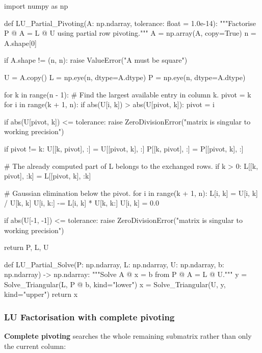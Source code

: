 \begin{python}
import numpy as np


def LU_Partial_Pivoting(A: np.ndarray,
                        tolerance: float = 1.0e-14):
    """Factorise P @ A = L @ U using partial row pivoting."""
    A = np.array(A, copy=True)
    n = A.shape[0]

    if A.shape != (n, n):
        raise ValueError("A must be square")

    U = A.copy()
    L = np.eye(n, dtype=A.dtype)
    P = np.eye(n, dtype=A.dtype)

    for k in range(n - 1):
        # Find the largest available entry in column k.
        pivot = k
        for i in range(k + 1, n):
            if abs(U[i, k]) > abs(U[pivot, k]):
                pivot = i

        if abs(U[pivot, k]) <= tolerance:
            raise ZeroDivisionError("matrix is singular to working precision")

        if pivot != k:
            U[[k, pivot], :] = U[[pivot, k], :]
            P[[k, pivot], :] = P[[pivot, k], :]

            # The already computed part of L belongs to the exchanged rows.
            if k > 0:
                L[[k, pivot], :k] = L[[pivot, k], :k]

        # Gaussian elimination below the pivot.
        for i in range(k + 1, n):
            L[i, k] = U[i, k] / U[k, k]
            U[i, k:] -= L[i, k] * U[k, k:]
            U[i, k] = 0.0

    if abs(U[-1, -1]) <= tolerance:
        raise ZeroDivisionError("matrix is singular to working precision")

    return P, L, U


def LU_Partial_Solve(P: np.ndarray,
                     L: np.ndarray,
                     U: np.ndarray,
                     b: np.ndarray) -> np.ndarray:
    """Solve A @ x = b from P @ A = L @ U."""
    y = Solve_Triangular(L, P @ b, kind="lower")
    x = Solve_Triangular(U, y, kind="upper")
    return x
\end{python}

\subsubsection{LU Factorisation with complete pivoting}

\textbf{Complete pivoting} searches the whole remaining submatrix rather than
only the current column:

